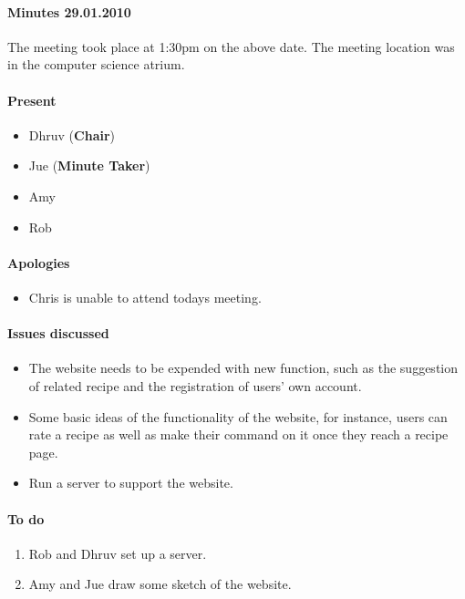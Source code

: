\paragraph{Minutes 29.01.2010}  
The meeting took place at 1:30pm on the above date. The meeting location was in the computer science atrium. 

\paragraph{Present}

\begin{itemize}
	\item Dhruv (\textbf{Chair})
	\item Jue (\textbf{Minute Taker})
	\item Amy 
	\item Rob
	
\end{itemize}


\paragraph{Apologies}

\begin{itemize}
	\item Chris is unable to attend todays meeting.
\end{itemize}


\paragraph{Issues discussed}

\begin{itemize}
	\item The website needs to be expended with new function, such as the suggestion of related recipe and the registration of users' own account.
	\item Some basic ideas of the functionality of the website, for instance, users can rate a recipe as well as make their command on it once they reach a recipe page.
	\item Run a server to support the website.
\end{itemize}

\paragraph{To do}

\begin{enumerate}
	\item Rob and Dhruv set up a server.
	\item Amy and Jue draw some sketch of the website.
\end{enumerate}


